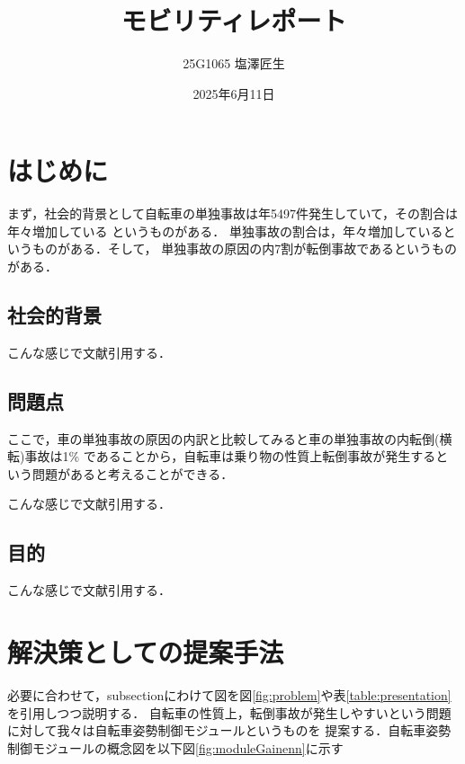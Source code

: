 \documentclass[uplatex,dvipdfmx]{jsarticle}
\begin{document}
\title{モビリティレポート}
\author{25G1065 塩澤匠生}
\date{2025年6月11日}
\maketitle
\section{はじめに}
まず，社会的背景として自転車の単独事故は年5497件発生していて，その割合は年々増加している
というものがある\cite{jikokensuu}．
単独事故の割合は，年々増加しているというものがある．そして，
単独事故の原因の内7割が転倒事故であるというものがある\cite{tandokuWariai}．

\subsection{社会的背景}
こんな感じで文献引用する\cite{ref:nobukawa2023,ref:nobukawa2023_2}．

\subsection{問題点}

ここで，車の単独事故の原因の内訳と比較してみると車の単独事故の内転倒(横転)事故は1\%
であることから，自転車は乗り物の性質上転倒事故が発生するという問題があると考えることができる．




こんな感じで文献引用する\cite{ref:nobukawa2023,ref:nobukawa2023_2}．

\subsection{目的}
こんな感じで文献引用する\cite{ref:nobukawa2023,ref:nobukawa2023_2}．

\section{解決策としての提案手法}
必要に合わせて，subsectionにわけて図を図\ref{fig:problem}や表\ref{table:presentation}
を引用しつつ説明する．
自転車の性質上，転倒事故が発生しやすいという問題に対して我々は自転車姿勢制御モジュールというものを
提案する．自転車姿勢制御モジュールの概念図を以下図\ref{fig:moduleGainenn}に示す
\end{document}
